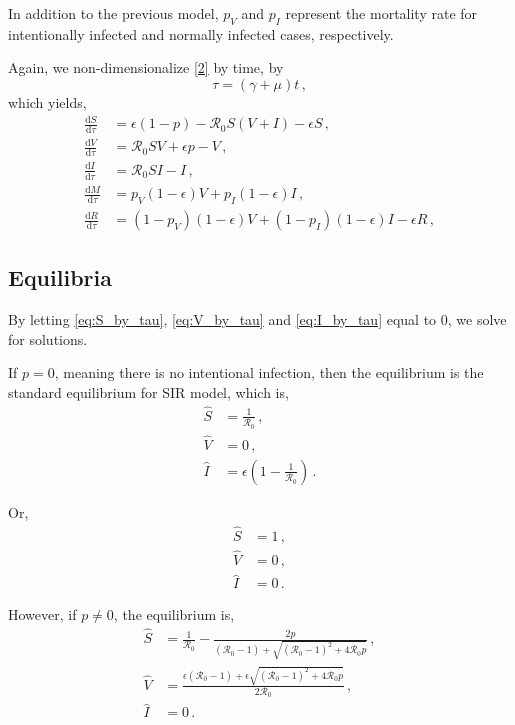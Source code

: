 \documentclass[12pt]{article}
\newcommand\dbyd[2]{\frac{\mathrm d{#1}}{\mathrm d{#2}}}
\newcommand{\R}{\mathcal{R}}
\newcommand{\pmV}{p_{V}}
\newcommand{\pmI}{p_{I}}
\begin{document}
In addition to the previous model, $\pmV$ and $\pmI$ represent the mortality rate for intentionally infected and normally infected cases, respectively.

Again, we non-dimensionalize \autoref{2} by time, by
\begin{equation}
\tau=(\gamma+\mu)t \,,
\end{equation}
which yields,
\begin{subequations}\label{eq:base_ODE}
\begin{align}
\dbyd{S}{\tau}&=\epsilon(1-p)- \R_0 S(V+I)-\epsilon S\,, \label{eq:S_by_tau}\\
\dbyd{V}{\tau}&=\R_0 SV+\epsilon p-V\,, \label{eq:V_by_tau}\\
\dbyd{I}{\tau}&=\R_0 SI-I\,, \label{eq:I_by_tau}\\
\dbyd{M}{\tau}&=\pmV(1-\epsilon) V+\pmI(1-\epsilon) I\,,\\
\dbyd{R}{\tau}&=(1-\pmV)(1-\epsilon) V+(1-\pmI)(1-\epsilon) I-\epsilon R\,,
\end{align}
\end{subequations}

\subsection{Equilibria}

By letting \autoref{eq:S_by_tau}, \autoref{eq:V_by_tau} and \autoref{eq:I_by_tau} equal to 0, we solve for solutions.

If $p=0$, meaning there is no intentional infection, then the equilibrium is the standard equilibrium for SIR model, which is,
\begin{subequations}
\begin{align}
\hat{S} &= \frac{1}{\R_0}\,,\\
\hat{V} &= 0\,,\\
\hat{I} &= \epsilon(1-\frac{1}{\R_0})\,.
\end{align}
\end{subequations}

Or,
\begin{subequations}
\begin{align}
\hat{S} &= 1\,,\\
\hat{V} &= 0\,,\\
\hat{I} &= 0\,.
\end{align}
\end{subequations}

However, if $p\neq 0$, the equilibrium is,
\begin{subequations}
\begin{align}
\hat{S}&= \frac{1}{\R_0}-\frac{2p}{(\R_0 -1)+ \sqrt{(\R_0-1)^2+4\R_0
         p}}\,, \label{eq:Shat}\\
\hat{V}&= \frac{\epsilon(\R_0 -1)+ \epsilon \sqrt{(\R_0-1)^2+4\R_0 p}}{2\R_0}\,, \label{eq:Vhat}\\
\hat{I}&=0\,. \label{eq:Ihat}
\end{align}
\end{subequations}
\end{document}
